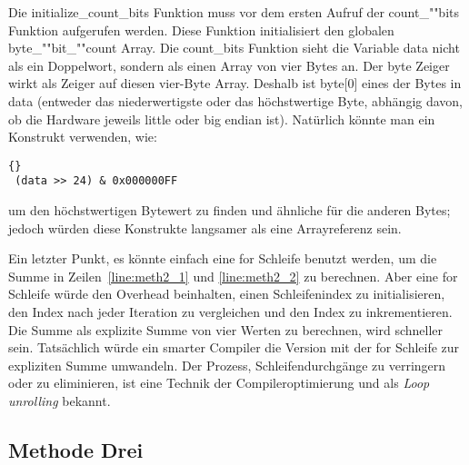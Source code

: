 Die {\code initialize\_count\_bits} Funktion muss vor dem ersten
Aufruf der {\code count\_""bits} Funktion aufgerufen werden. Diese
Funktion initialisiert den globalen  {\code byte\_""bit\_""count}
Array. Die {\code count\_bits} Funktion sieht die Variable {\code
data} nicht als ein Doppelwort, sondern als einen Array von vier
Bytes an. Der {\code byte} Zeiger wirkt als Zeiger auf diesen
vier-Byte Array. Deshalb ist {\code byte[0]} eines der Bytes in
{\code data} (entweder das niederwertigste oder das h\"{o}chstwertige
Byte, abh\"{a}ngig davon, ob die Hardware jeweils little oder big endian
ist). Nat\"{u}rlich k\"{o}nnte man ein Konstrukt verwenden, wie:
\begin{lstlisting}[stepnumber=0]{}
 (data >> 24) & 0x000000FF
\end{lstlisting}
\noindent um den h\"{o}chstwertigen Bytewert zu finden und \"{a}hnliche f\"{u}r
die anderen Bytes; jedoch w\"{u}rden diese Konstrukte langsamer als eine
Arrayreferenz sein.

Ein letzter Punkt, es k\"{o}nnte einfach eine {\code for} Schleife
benutzt werden, um die Summe in Zeilen~\ref{line:meth2_1} und
\ref{line:meth2_2} zu berechnen. Aber eine {\code for} Schleife
w\"{u}rde den Overhead beinhalten, einen Schleifenindex zu
initialisieren, den Index nach jeder Iteration zu vergleichen und
den Index zu inkrementieren. Die Summe als explizite Summe von vier
Werten zu berechnen, wird schneller sein. Tats\"{a}chlich w\"{u}rde ein
smarter Compiler die Version mit der {\code for} Schleife zur
expliziten Summe umwandeln. Der Prozess, Schleifendurchg\"{a}nge zu
verringern oder zu eliminieren, ist eine Technik der
Compileroptimierung und als \emph{Loop unrolling} bekannt.

\subsection{Methode Drei}

